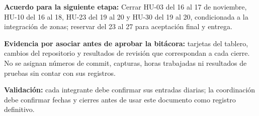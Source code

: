 \textbf{Acuerdo para la siguiente etapa:} Cerrar HU-03 del 16 al 17 de noviembre, HU-10 del 16 al 18, HU-23 del 19 al 20 y HU-30 del 19 al 20, condicionada a la integración de zonas; reservar del 23 al 27 para aceptación final y entrega.

\textbf{Evidencia por asociar antes de aprobar la bitácora:} tarjetas del tablero, cambios del repositorio y resultados de revisión que correspondan a cada cierre. No se asignan números de commit, capturas, horas trabajadas ni resultados de pruebas sin contar con sus registros.

\textbf{Validación:} cada integrante debe confirmar sus entradas diarias; la coordinación debe confirmar fechas y cierres antes de usar este documento como registro definitivo.

